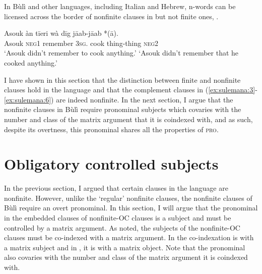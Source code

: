 \documentclass[output=paper,colorlinks,citecolor=brown]{langscibook}
\begin{document}
In Bùlì and other languages, including Italian and Hebrew, n-words can be licensed across the border of nonfinite clauses in but not finite ones, . 

\ea%
    \label{ex:sulemana:15}
    \ea%
    \label{ex:sulemana:15a}
    \gll    Asouk àn tīeri  wà dīg jāab-jāab  *(ā).\\
            Asouk  \textsc{neg1}  remember \textsc{3sg}. cook thing-thing  \textsc{neg2} \\
    \glt    `Asouk didn't remember to cook anything.'
    \glt    `Asouk didn't remember that he cooked anything.' 
    \z
\z

I have shown in this section that the distinction between finite and nonfinite clauses hold in the language and that the complement clauses in (\ref{ex:sulemana:3}-\ref{ex:sulemana:6})  are indeed nonfinite. 
In the next section, I  argue that the nonfinite clauses in Bùlì require pronominal subjects which covaries with the number and class of the matrix argument that it is coindexed with, and as such, despite its overtness, this pronominal shares all the properties of \textsc{pro}. 

\section{Obligatory controlled subjects}\label{sec:sulemana:4}

In the previous section, I argued that certain clauses in the language are nonfinite. However, unlike the `regular' nonfinite clauses, the nonfinite clauses of Bùlì require an overt pronominal. In this section, I will argue that the pronominal in the embedded clauses of nonfinite-OC clauses is a subject and must be controlled by a matrix argument.  As noted, the subjects of the nonfinite-OC clauses must be co-indexed with a matrix argument. In  the co-indexation is with a matrix subject and in , it is with a matrix object. Note that the pronominal also covaries with the number and class of the matrix argument it is coindexed with. 
\end{document}
